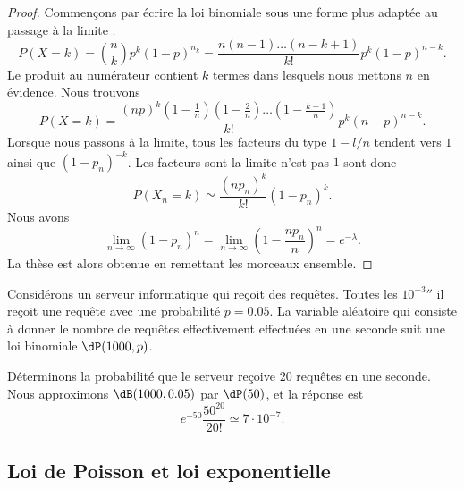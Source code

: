 \begin{proof}
    Commençons par écrire la loi binomiale sous une forme plus adaptée au passage à la limite :
    \begin{equation}
        P(X=k)={n\choose k}p^k(1-p)^{n_k}=\frac{ n(n-1)\ldots (n-k+1) }{ k! }p^k(1-p)^{n-k}.
    \end{equation}
    Le produit au numérateur contient \( k\) termes dans lesquels nous mettons \( n\) en évidence. Nous trouvons
    \begin{equation}
        P(X=k)=\frac{ (np)^k\left( 1-\frac{1}{ n } \right)\left( 1-\frac{ 2 }{ n } \right)\ldots\left( 1-\frac{ k-1 }{ n } \right) }{ k! }p^k(n-p)^{n-k}.
    \end{equation}
    Lorsque nous passons à la limite, tous les facteurs du type \( 1-l/n\) tendent vers \( 1\) ainsi que \( (1-p_n)^{-k}\). Les facteurs sont la limite n'est pas \( 1\) sont donc
    \begin{equation}
        P(X_n=k)\simeq\frac{ (np_n)^k }{ k! }(1-p_n)^k.
    \end{equation}
    Nous avons
    \begin{equation}
        \lim_{n\to \infty} (1-p_n)^n=\lim_{n\to \infty} \left( 1-\frac{ np_n }{ n } \right)^n= e^{-\lambda}.
    \end{equation}
    La thèse est alors obtenue en remettant les morceaux ensemble.
\end{proof}

\begin{example}
    Considérons un serveur informatique qui reçoit des requêtes. Toutes les \( \unit{10^{-3}}{\second}\) il reçoit une requête avec une probabilité \( p=0.05\). La variable aléatoire qui consiste à donner le nombre de requêtes effectivement effectuées en une seconde suit une loi binomiale \( \dP(1000,p)\).

    Déterminons la probabilité que le serveur reçoive \( 20\) requêtes en une seconde. Nous approximons \( \dB(1000,0.05)\) par \( \dP(50)\), et la réponse est
    \begin{equation}
        e^{-50}\frac{ 50^{20} }{ 20! }\simeq 7\cdot 10^{-7}.
    \end{equation}
\end{example}

\subsection{Loi de Poisson et loi exponentielle}
\label{subsecPoissonetexpo}

